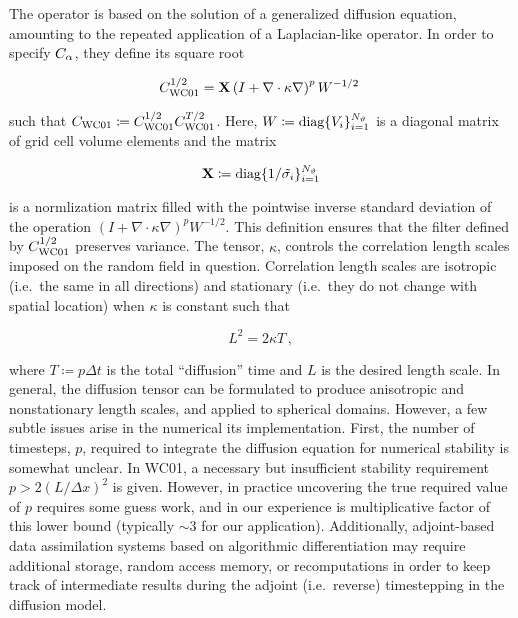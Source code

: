 The operator is based on the solution of a generalized diffusion equation,
amounting to the repeated application of a Laplacian-like operator.
In order to specify $C_\alpha$, they define its square root
\begin{linenomath*}\begin{equation}
    C^{1/2}_\text{WC01} = \mathbf{X}
        \left(I + \nabla\cdot\kappa\nabla \right)^p W^{-1/2} \,
\end{equation}\end{linenomath*}
such that
$C_\text{WC01} \coloneqq C_\text{WC01}^{1/2}C_\text{WC01}^{T/2}$.
Here, $W \coloneqq \text{diag}\{V_i\}_{i=1}^{N_{\vartheta}}$ is a diagonal matrix of
grid cell volume elements and the matrix
\begin{linenomath*}\begin{equation*}
    \mathbf{X} \coloneqq \text{diag}\{1/\tilde{\sigma_i}\}_{i=1}^{N_{\vartheta}}
\end{equation*}\end{linenomath*}
is a normlization matrix filled with the pointwise inverse standard deviation of the
operation $\left(I+\nabla\cdot\kappa\nabla \right)^p W^{-1/2}$.
This definition ensures that the filter defined by $C^{1/2}_\text{WC01}$
preserves variance.
The tensor, $\kappa$, controls the correlation length scales imposed on the
random field in question.
Correlation length scales are isotropic (i.e.\ the same in all directions) and
stationary (i.e.\ they do not change with spatial location) when $\kappa$ is
constant such that
\begin{linenomath*}\begin{equation*}
    L^2 = 2\kappa T \, ,
\end{equation*}\end{linenomath*}
where $T\coloneqq p \Delta t$ is the total ``diffusion'' time and $L$ is the
desired length scale.
In general, the diffusion tensor can be formulated to produce anisotropic and
nonstationary length scales, and applied to spherical domains.
However, a few subtle issues arise in the numerical its implementation.
First, the number of timesteps, $p$, required to integrate the diffusion
equation for numerical stability is somewhat unclear.
In WC01, a necessary but insufficient stability requirement
$p > 2 (L/\Delta x)^2$ is given.
However, in practice uncovering the true required value of $p$ requires some
guess work, and in our experience is multiplicative factor of this lower bound
(typically $\sim 3$ for our application).
Additionally, adjoint-based data assimilation systems based on algorithmic
differentiation may require additional storage, random access memory, or recomputations in order
to keep track of intermediate results during the adjoint (i.e.\ reverse) timestepping
in the diffusion model.

